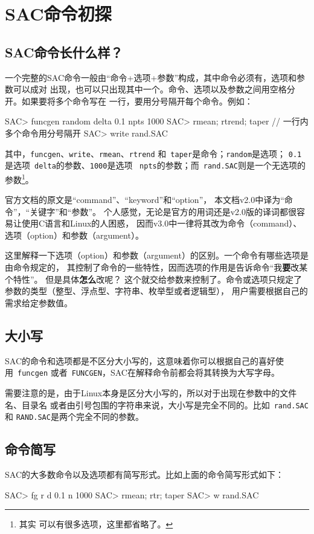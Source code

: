 \section{SAC命令初探}
\subsection{SAC命令长什么样？}
一个完整的SAC命令一般由``命令+选项+参数''构成，其中命令必须有，选项和参数可以成对
出现，也可以只出现其中一个。命令、选项以及参数之间用空格分开。如果要将多个命令写在
一行，要用分号隔开每个命令。例如：
\begin{SACCode}
SAC> funcgen random delta 0.1 npts 1000
SAC> rmean; rtrend; taper                 // 一行内多个命令用分号隔开
SAC> write rand.SAC
\end{SACCode}
其中，\verb+funcgen+、\verb+write+、\verb+rmean+、\verb+rtrend+
和~\verb+taper+是命令；\verb+random+是选项；
\verb+0.1+是选项~\verb+delta+的参数、\verb+1000+是选项
~\verb+npts+的参数；而~\verb+rand.SAC+则是一个无选项的参数\footnote{其实
可以有很多选项，这里都省略了。}。

\begin{Tips}
官方文档的原文是``command''、``keyword''和``option''，
本文档v2.0中译为``命令''，``关键字''和``参数''。
个人感觉，无论是官方的用词还是v2.0版的译词都很容易让使用C语言和Linux的人困惑，
因而v3.0中一律将其改为命令（command）、选项（option）和参数（argument）。

这里解释一下选项（option）和参数（argument）的区别。一个命令有哪些选项是由命令规定的，
其控制了命令的一些特性，因而选项的作用是告诉命令``我\textbf{要}改某个特性''。
但是具体\textbf{怎么}改呢？
这个就交给参数来控制了。命令或选项只规定了参数的类型（整型、浮点型、字符串、枚举型或者逻辑型），
用户需要根据自己的需求给定参数值。
\end{Tips}

\subsection{大小写}
SAC的命令和选项都是不区分大小写的，这意味着你可以根据自己的喜好使用~\verb+funcgen+
或者~\verb+FUNCGEN+，SAC在解释命令前都会将其转换为大写字母。

需要注意的是，由于Linux本身是区分大小写的，所以对于出现在参数中的文件名、目录名
或者由引号包围的字符串来说，大小写是完全不同的。比如~\verb+rand.SAC+和
\verb+RAND.SAC+是两个完全不同的参数。

\subsection{命令简写}
SAC的大多数命令以及选项都有简写形式。比如上面的命令简写形式如下：
\begin{SACCode}
SAC> fg r d 0.1 n 1000
SAC> rmean; rtr; taper
SAC> w rand.SAC
\end{SACCode}

